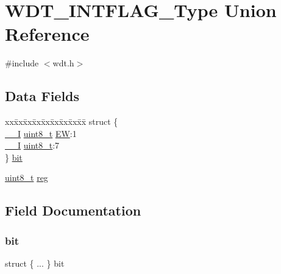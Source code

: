 \hypertarget{union_w_d_t___i_n_t_f_l_a_g___type}{}\section{W\+D\+T\+\_\+\+I\+N\+T\+F\+L\+A\+G\+\_\+\+Type Union Reference}
\label{union_w_d_t___i_n_t_f_l_a_g___type}


{\ttfamily \#include $<$wdt.\+h$>$}

\subsection*{Data Fields}
\begin{DoxyCompactItemize}
\item 
\begin{tabbing}
xx\=xx\=xx\=xx\=xx\=xx\=xx\=xx\=xx\=\kill
struct \{\\
\>\mbox{\hyperlink{core__cm0plus_8h_af63697ed9952cc71e1225efe205f6cd3}{\_\_I}} \mbox{\hyperlink{union_w_d_t___i_n_t_f_l_a_g___type_a5b4208c6f4c4a4290c4f2804d1eb1d5b}{uint8\_t}} \mbox{\hyperlink{union_w_d_t___i_n_t_f_l_a_g___type_af3cb0564a7de6739c82f0210c4ccb15b}{EW}}:1\\
\>\mbox{\hyperlink{core__cm0plus_8h_af63697ed9952cc71e1225efe205f6cd3}{\_\_I}} \mbox{\hyperlink{union_w_d_t___i_n_t_f_l_a_g___type_a5b4208c6f4c4a4290c4f2804d1eb1d5b}{uint8\_t}}:7\\
\} \mbox{\hyperlink{union_w_d_t___i_n_t_f_l_a_g___type_a70716abf00919d01b6b3fbb9b7224833}{bit}}\\

\end{tabbing}\item 
\mbox{\hyperlink{union_w_d_t___i_n_t_f_l_a_g___type_a5b4208c6f4c4a4290c4f2804d1eb1d5b}{uint8\+\_\+t}} \mbox{\hyperlink{union_w_d_t___i_n_t_f_l_a_g___type_a9428adc9af4653a2050e2536b55dec8d}{reg}}
\end{DoxyCompactItemize}


\subsection{Field Documentation}
\mbox{\label{union_w_d_t___i_n_t_f_l_a_g___type_a70716abf00919d01b6b3fbb9b7224833}} 
\subsubsection{\texorpdfstring{bit}{bit}}
{\footnotesize\ttfamily struct \{ ... \}   bit}

